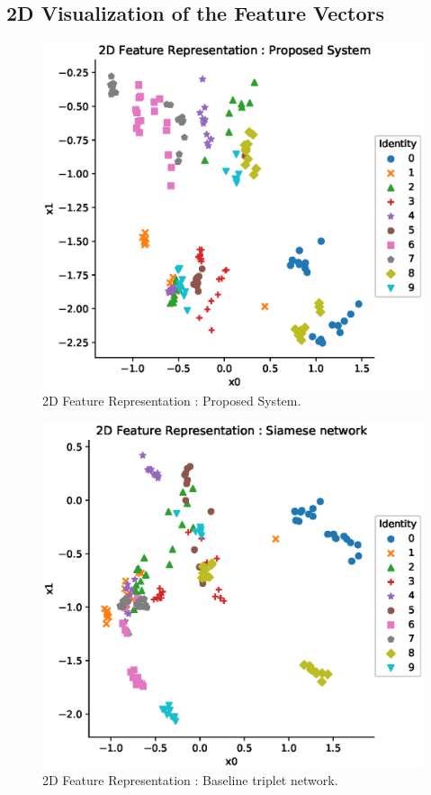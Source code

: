 \subsection{2D Visualization of the Feature Vectors}
\begin{figure}[!ht]
    \includegraphics[width=\textwidth]{fig_2d_triKAR_10_v1.eps}
    \caption{2D Feature Representation : Proposed System.} \label{fig_2d_triKAR_10}
\end{figure}
\begin{figure}[!ht]
    \includegraphics[width=\textwidth]{fig_2d_tribase_10_v1.eps}
    \caption{2D Feature Representation : Baseline triplet network.} \label{fig_2d_tribase_10}
\end{figure}
